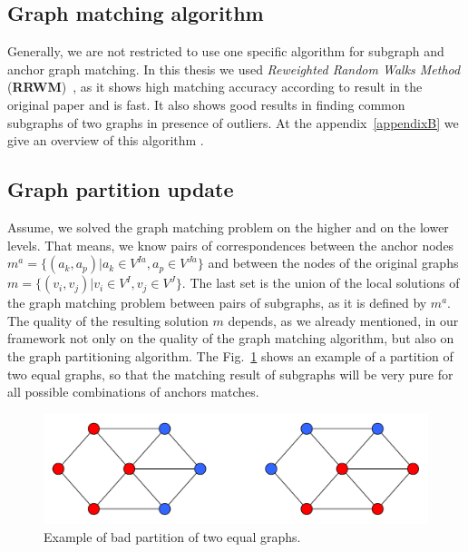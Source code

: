 \subsection{Graph matching algorithm}
Generally, we are not restricted to use one specific algorithm for subgraph and anchor graph matching. In this thesis we used \emph{Reweighted Random Walks Method} (\textbf{RRWM})~\cite{Cho2010_RRWM}, as it shows high matching accuracy according to result in the original paper and is fast. It also shows good results in finding common subgraphs of two graphs in presence of outliers. At the appendix~\ref{appendixB} we give an overview of this algorithm .

\subsection{Graph partition update}
Assume, we solved the graph matching problem on the higher and on the lower levels. That means, we know pairs of correspondences between the anchor nodes $m^a = \{(a_k, a_p)|a_k\in V^{Ia}, a_p\in V^{Ja}\}$ and between the nodes of the original graphs $m = \{(v_i, v_j)|v_i\in V^{I}, v_j\in V^{J}\}$. The last set is the union of the local solutions of the graph matching problem between pairs of subgraphs, as it is defined by $m^a$.
The quality of the resulting solution $m$ depends, as we already mentioned, in our framework not only on the quality of the graph matching algorithm, but also on the graph partitioning algorithm.
The Fig.~\ref{fig:badpartition} shows an example of a partition of two equal graphs, so that the matching result of subgraphs will be very pure for all possible combinations of anchors matches.

\begin{figure}[h]
	\centering
	\includegraphics[scale=0.35]{chapter2/fig/badpartition.pdf}
	\caption[Example of bad partition of two equal graphs]{Example of bad partition of two equal graphs.} \label{fig:badpartition}
\end{figure}

